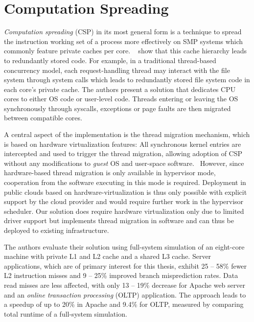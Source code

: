 \documentclass[12pt,a4paper]{book}
\begin{document}
\section{Computation Spreading}\label{ch:relwork:compspr}
\emph{Computation spreading} (CSP) in its most general form is a technique to spread the instruction working set of a process more effectively on SMP systems which commonly feature private caches per core.
\citeauthor*{compspr}~\cite{compspr} show that this cache hierarchy leads to redundantly stored code.
For example, in a traditional thread-based concurrency model, each request-handling thread may interact with the file system through system calls which leads to redundantly stored file system code in each core's private cache.
The authors present a solution that dedicates CPU cores to either OS code or user-level code.
Threads entering or leaving the OS synchronously through syscalls, exceptions or page faults are then migrated between compatible cores.~\cite{compspr}

A central aspect of the implementation is the thread migration mechanism, which is based on hardware virtualization features:
All synchronous kernel entries are intercepted and used to trigger the thread migration,  allowing adoption of CSP without any modifications to \textit{guest} OS and user-space software.~\cite{compspr}
However, since hardware-based thread migration is only available in hypervisor mode, cooperation from the software executing in this mode is required.
Deployment in public clouds based on hardware-virtualization is thus only possible with explicit support by the cloud provider and would require further work in the hypervisor scheduler.
Our solution does require hardware virtualization only due to limited driver support but implements thread migration in software and can thus be deployed to existing infrastructure.

The authors evaluate their solution using full-system simulation of an eight-core machine with private L1 and L2 cache and a shared L3 cache.
Server applications, which are of primary interest for this thesis, exhibit 25 -- 58\% fewer L2 instruction misses and 9 -- 25\% improved branch misprediction rates.
Data read misses are less affected, with only 13 -- 19\% decrease for Apache web server and an \emph{online transaction processing} (OLTP) application.
The approach leads to a speedup of up to 20\% in Apache and 9.4\% for OLTP, measured by comparing total runtime of a full-system simulation.~\cite{compspr}
\end{document}
